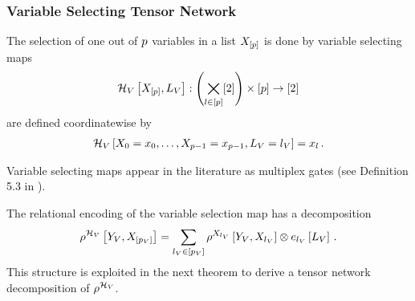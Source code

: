 \subsubsection{Variable Selecting Tensor Network}


\begin{definition}\label{def:variableSelector}
	The selection of one out of $p$ variables in a list $X_{[p]}$ is done by variable selecting maps
	\begin{align}
		\mathcal{H}_{V}\left[X_{[p]},L_{V}\right]:  \left(\bigtimes_{l\in[p]}[2]\right) \times [p]  \rightarrow [2]
	\end{align}
	are defined coordinatewise by
	\begin{align}
		\mathcal{H}_{V}\left[X_{0}=x_{0},\ldots,X_{p-1}=x_{p-1},L_{V}=l_{V}\right] = x_{l} \, .
	\end{align}
\end{definition}
	
Variable selecting maps appear in the literature as multiplex gates (see Definition 5.3 in \cite{koller_probabilistic_2009}).

The relational encoding of the variable selection map has a decomposition 
\begin{align*}
	\rho^{\mathcal{H}_{V}}\left[Y_{V},X_{[p_{V}]}\right]
	= \sum_{l_{V}\in[p_{V}]} 
	\rho^{X_{l_{V}}}\left[Y_{V},X_{l_{V}}\right] \otimes  e_{l_{V}}\left[L_{V}\right] \, . 
\end{align*}
This structure is exploited in the next theorem to derive a tensor network decomposition of $\rho^{\mathcal{H}_{V}}$.


